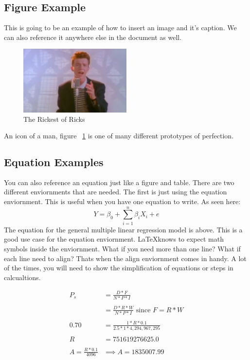 \documentclass[./dissertation.tex]{subfiles}
\begin{document}
      \subsection{Figure Example}
      This is going to be an example of how to insert an image and it's caption. We can also reference it anywhere else in the document as well.
      \begin{figure}[h]
        \centering\includegraphics[width=0.5\textwidth]{figures/some-sweet-rick}
        \caption{The Rickest of Ricks}
        \label{fig:terrifrick}
      \end{figure}
      An icon of a man, figure ~\ref{fig:terrifrick} is one of many different prototypes of perfection.
      
      \subsection{Equation Examples}
        You can also reference an equation just like a figure and table. There are two different enviornments that are needed. The first is just using the equation enviornment. This is useful when you have one equation to write. As seen here:
          \begin{equation*}
            Y=\beta_{0} + \sum\limits_{i=1}^n \beta_{i}X_{i} + e
          \end{equation*}
        The equation for the general multiple linear regression model is above. This is a good use case for the equation enviornment. \LaTeX  knows to expect math symbols inside the enviornment. What if you need more than one line? What if each line need to align? Thats when the align enviornment comes in handy. A lot of the times, you will need to show the simplification of equations or steps in calcualtions.
          \begin{center}
            \begin{align*}
              P_{s} &= \frac{D*F}{N*P*I}\\
                            \\
              &= \frac{D*R*W}{N*P*I} \text{  since } F=R*W\\
                      \\
              0.70 &= \frac{1*R*0.1}{2.5*1*4,294,967,295}\\
                      \\
             R &= 751619276625.0 \\
             \\
             A=\frac{R*0.1}{4096} &\implies A = 1835007.99
           \end{align*}
         \end{center}
\end{document}

